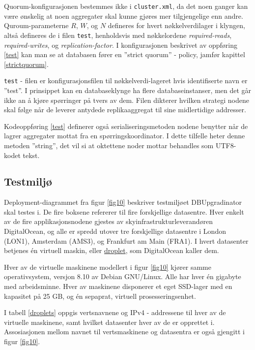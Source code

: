 

Quorum-konfigurasjonen bestemmes ikke i \texttt{cluster.xml}, da det noen ganger kan være ønskelig at noen aggregater skal kunne gjøres mer tilgjengelige enn andre. Quroum-parameterne \(R\), \(W\), og \(N\) defineres for hvert nøkkelverdi\-lager i klyngen, altså defineres de i filen \texttt{test}, henholdsvis med nøkkelordene \emph{required-reads}, \emph{required-writes}, og \emph{replication-factor}. I konfigurasjonen beskrivet av oppføring \ref{test} kan man se at databasen fører en ''strict quorum'' - policy, jamfør kapittel \ref{strictquorum}.

\texttt{test} - filen er konfigurasjonsfilen til nøkkelverdi-lageret hvis identifiserte navn er ''test''.  I prinsippet kan en databaseklynge ha flere databaseinstanser, men det går ikke an å kjøre spørringer på tvers av dem. Filen dikterer hvilken strategi nodene skal følge når de leverer antydede replika\-aggregat til sine midlertidige addresser.

Kodeoppføring \ref{test} definerer også serialiseringsmetoden nodene benytter når de lagrer aggregater mottat fra en spørringskoordinator. I dette tilfelle heter denne metoden ''string'', det vil si at oktettene noder mottar behandles som UTF8-kodet tekst.

\subsection{Testmiljø}

Deployment-diagrammet fra figur \ref{fig10} beskriver testmiljøet DBUpgradinator skal testes i. De fire boksene refererer til fire forskjellige datasentre. Hver enkelt av de fire applikasjonsnodene gjestes av skyinfrastrukturleverandøren DigitalOcean, og alle er spredd utover tre forskjellige datasentre i London (LON1), Amsterdam (AMS3), og Frankfurt am Main (FRA1). I hvert datasenter betjenes én virtuell maskin, eller \underline{droplet}, som DigitalOcean kaller dem.

Hver av de virtuelle maskinene modellert i figur \ref{fig10} kjører samme operativsystem, versjon 8.10 av Debian GNU/Linux. Alle har hver én gigabyte med arbeidsminne. Hver av maskinene disponerer et eget SSD-lager med en kapasitet på 25 GB, og én sepaprat, virtuell prosesseringsenhet.



I tabell \ref{droplets} oppgis vertsnavnene og IPv4 - addressene til hver av de virtuelle maskinene, samt hvilket datasenter hver av de er opprettet i. Assosiasjonen mellom navnet til vertsmaskinene og datasentra er også gjengitt i figur \ref{fig10}.

